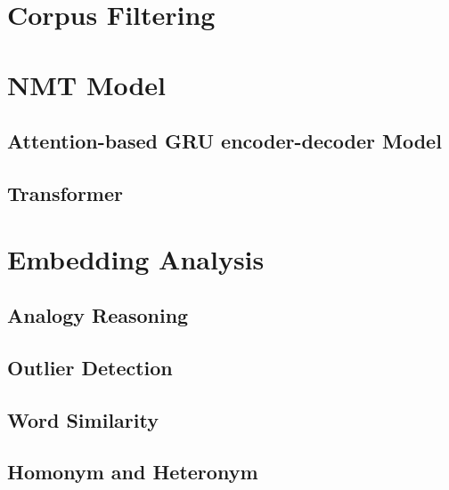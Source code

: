 \section{Corpus Filtering} \label{sec:corpus_filtering}

\section{NMT Model} \label{sec:nmt_model}
\subsection{Attention-based GRU encoder-decoder Model} \label{sec:rnn}
\subsection{Transformer} \label{sec:transformer}

\section{Embedding Analysis} \label{sec:embedding_analysis}
\subsection{Analogy Reasoning} \label{sec:analogy}
\subsection{Outlier Detection} \label{sec:outlier}
\subsection{Word Similarity} \label{sec:similarity}
\subsection{Homonym and Heteronym} \label{sec:homonym_heteronym}